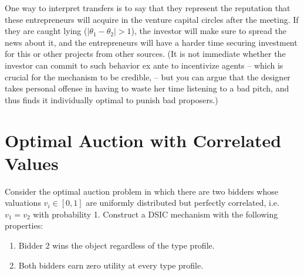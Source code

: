 \documentclass[a4paper]{article}
\newif\ifsolutions
\begin{document}
\begin{enumerate}
		One way to interpret transfers is to say that they represent the reputation that these entrepreneurs will acquire in the venture capital circles after the meeting. If they are caught lying ($|\theta_1 - \theta_2|>1$), the investor will make sure to spread the news about it, and the entrepreneurs will have a harder time securing investment for this or other projects from other sources. 
		(It is not immediate whether the investor can commit to such behavior ex ante to incentivize agents -- which is crucial for the mechanism to be credible, -- but you can argue that the designer takes personal offense in having to waste her time listening to a bad pitch, and thus finds it individually optimal to punish bad proposers.)
	\end{enumerate}
\fi 



\section{Optimal Auction with Correlated Values}
	Consider the optimal auction problem in which there are two bidders whose valuations $v_i \in [0,1]$ are uniformly distributed but 
	perfectly correlated, i.e. $v_1 = v_2$ with probability 1.  Construct a DSIC mechanism with the following properties:
	\begin{enumerate}
		\item Bidder 2 wins the object regardless of the type profile.
		\item Both bidders earn zero utility at every type profile.
	\end{enumerate}

\ifsolutions
\section*{Solution}
	Consider the following allocation:
	\[k_1(v_1,v_2)=0\]
	\[k_2(v_1,v_2)=\left\{\begin{array}{cc} 0 & \text{ if }\quad v_2\neq v_1\\
		1 & \quad\text{otherwise}\quad
		
	\end{array}
	\right.\]
	\[t_1(v_1,v_2)=0\]
	\[t_2(v_1,v_2)=\left\{\begin{array}{cc} 0 & \text{if}\quad v_2\neq v_1\\
		v_1 & \quad\text{otherwise}\quad\end{array}\right.\]
	Note that for bidder 1 it is weakly dominant to say her valuation: she never gets the good so she might as well say $v_1$. For player 2, we have exactly the same situation: given the message sent by agent 1, she is indifferent between saying the truth and not, so telling the truth is weakly dominant. Agent 2 gets the good always and both bidders have 0 utility at every type profile.
\fi 
\end{document}
